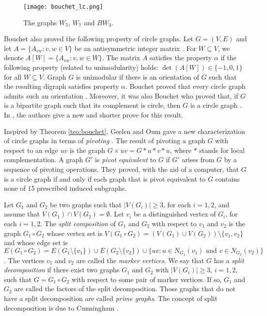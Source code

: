 \documentclass[12pt]{book}
\theoremstyle{plain}
\theoremstyle{remark}
\begin{document}
\begin{figure}[h]
\centering
\texttt{[image: bouchet\_lc.png]}
\caption{The graphs $W_5$, $W_7$ and $BW_3$.} \label{fig:bouchet_lc}
\end{figure} 

Bouchet also proved the following property of circle graphs. Let $G = (V, E)$ and let $A = \{A_{vw} : v, w \in V \}$ be an antisymmetric integer matrix \cite{B87}. For $W \subseteq V$, we denote $A\left[W\right] = \{A_{vw} : v, w \in W \}$. The matrix $A$ satisfies the property $\alpha$ if the following property (related to unimodularity) holds: $\det(A\left[W\right]) \in \{-1, 0, 1\}$ for all $W\subseteq V$. Graph $G$ is unimodular if there is an orientation of $G$ such that the resulting digraph satisfies property $\alpha$. Bouchet proved that every circle graph admits such an orientation \cite{B87}.
Moreover, it was also Bouchet who proved that, if $G$ is a bipartite graph such that its complement is circle, then $G$ is a circle graph \cite{B99}. In \cite{ES19}, the authors give a new and shorter prove for this result.
       
Inspired by Theorem \ref{teo:bouchet}, Geelen and Oum gave a new characterization of circle graphs in terms of \emph{pivoting} \cite{GO09}. The result of pivoting a graph $G$ with respect to an edge $uv$ is the graph $G \times uv = G * u * v * u$, where $*$ stands for local complementation. 
A graph $G'$ is \emph{pivot equivalent }to $G$ if $G'$ arises from $G$ by a sequence of pivoting operations. They proved, with the aid of a computer, that $G$ is a circle graph if and only if each graph that is pivot equivalent to $G$ contains none of 15 prescribed induced subgraphs.


Let $G_1$ and $G_2$ be two graphs such that $|V(G_i)| \geq 3$, for each $i = 1,2$, and assume that $V(G_1) \cap V(G_2) = \emptyset$. Let $v_i$ be a distinguished vertex of $G_i$, for each $i = 1, 2$. The \emph{split composition }of $G_1$ and $G_2$ with respect to $v_1$ and $v_2$ is the graph $G_1 \circ G_2$ whose vertex set is $V(G_1 \circ G_2) = (V(G_1)\cup V(G_2)) \setminus \{v_1,v_2\}$ and whose edge set is $E(G_1 \circ G_2) = E(G_1 \setminus \{v_1\}) \cup E(G_2 \setminus \{v_2\}) \cup \{uv : u \in N_{G_1}(v_1) \mbox{ and } v \in N_{G_2}(v_2)\}$. The vertices $v_1$ and $v_2$ are called the \emph{marker vertices}. We say that $G$ has a \emph{split decomposition} if there exist two graphs $G_1$ and $G_2$ with $|V(G_i)| \geq 3$, $i = 1,2$, such that $G = G_1 \circ G_2$ with respect to some pair of marker vertices. If so, $G_1$ and $G_2$ are called the factors of the split decomposition. Those graphs that do not have a split decomposition are called \emph{prime graphs}. The concept of split decomposition is due to Cunningham \cite{C82}. 
\end{document}
